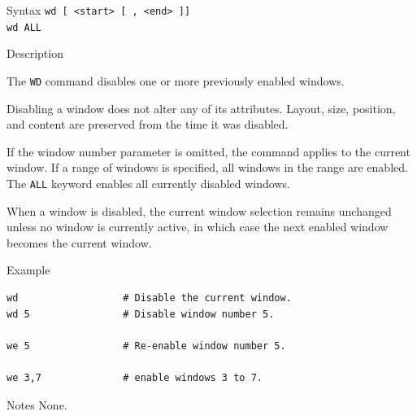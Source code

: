 %
%
\pagebreak
{}

\begin{iPageDescEntry}{Syntax}
\texttt{wd [ <start> [ , <end> ]]} \\
\texttt{wd ALL} \\
\end{iPageDescEntry}

\begin{iPageDescEntry}{Description}

The \texttt{WD} command disables one or more previously enabled windows.

Disabling a window does not alter any of its attributes. Layout, size, position, and content are preserved from the time it was disabled.

If the window number parameter is omitted, the command applies to the current window. If a range of windows is specified, all windows in the range are enabled. The \texttt{ALL} keyword enables all currently disabled windows.

When a window is disabled, the current window selection remains unchanged unless no window is currently active, in which case the next enabled window becomes the current window.

\end{iPageDescEntry}

\begin{iPageDescOpEntry}{Example}
\begin{lstlisting}[style=iPageOpStyle]
wd                  # Disable the current window.
wd 5                # Disable window number 5.

we 5                # Re-enable window number 5.

we 3,7              # enable windows 3 to 7.
\end{lstlisting}
\end{iPageDescOpEntry}

\begin{iPageDescEntry}{Notes}
None.
\end{iPageDescEntry}
